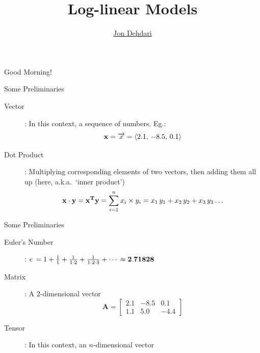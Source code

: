\documentclass[xcolor=pdftex,x11names,table,hyperref]{beamer}
\begin{document}
\title{Log-linear Models \\[1.5em]
 }
\author{\href{http://jon.dehdari.org}{Jon Dehdari}}
\frame{\titlepage}

\begin{frame}{Good Morning!}
	\begin{center}
	\end{center}
\end{frame}

\begin{frame}{Some Preliminaries}
\begin{description}
	\item[Vector]: In this context, a sequence of numbers. Eg.:
	\begin{equation*}
	{\bf x} = \overrightarrow{x} = \langle 2.1, \, -8.5, \, 0.1 \rangle
	\end{equation*}
	\pause
	\item[Dot Product]: Multiplying corresponding elements of two vectors, then adding them all up (here, a.k.a.\ `inner product')
	\begin{equation*}
	{\bf x \cdot y} = {\bf x^Ty} =  \sum_{i=1}^n x_i \times y_i = x_1 \, y_1 + x_2 \, y_2 + x_3 \, y_3 \ldots
	\end{equation*}
\end{description}
\end{frame}

\begin{frame}{Some Preliminaries}
\begin{description}
	\item[Euler's Number]: ${\mathnormal e} \, = 1 + \frac{1}{1} + \frac{1}{1\cdot 2} + \frac{1}{1\cdot 2\cdot 3} + \cdots \, \approx {\bf 2.71828} $
	\pause
	\item[Matrix]: A 2-dimensional vector
	\begin{equation*}
	{\boldsymbol A} =
	\begin{bmatrix}
	2.1 & -8.5 & 0.1 \\
	1.1 & 5.0 & -4.4
	 \end{bmatrix}
	\end{equation*}
	\pause
	\item[Tensor]: In this context, an $n$-dimensional vector
\end{description}
\end{frame}
\end{document}
